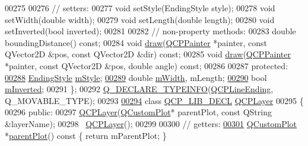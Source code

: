 \begin{DoxyCode}
00275   
00276   \textcolor{comment}{// setters:}
00277   \textcolor{keywordtype}{void} setStyle(EndingStyle style);
00278   \textcolor{keywordtype}{void} setWidth(\textcolor{keywordtype}{double} width);
00279   \textcolor{keywordtype}{void} setLength(\textcolor{keywordtype}{double} length);
00280   \textcolor{keywordtype}{void} setInverted(\textcolor{keywordtype}{bool} inverted);
00281   
00282   \textcolor{comment}{// non-property methods:}
00283   \textcolor{keywordtype}{double} boundingDistance() \textcolor{keyword}{const};
00284   \textcolor{keywordtype}{void} \hyperlink{a00116_a2e9b3d14dffa43c79835869d488936c9}{draw}(\hyperlink{a00047}{QCPPainter} *painter, \textcolor{keyword}{const} QVector2D &pos, \textcolor{keyword}{const} QVector2D &dir) \textcolor{keyword}{const};
00285   \textcolor{keywordtype}{void} \hyperlink{a00116_a2e9b3d14dffa43c79835869d488936c9}{draw}(\hyperlink{a00047}{QCPPainter} *painter, \textcolor{keyword}{const} QVector2D &pos, \textcolor{keywordtype}{double} angle) \textcolor{keyword}{const};
00286   
00287 \textcolor{keyword}{protected}:
\hypertarget{a00116_source_l00288}{}\hyperlink{a00046_a4696fc9117b60f1ca7690fcd2ba56611}{00288}   \hyperlink{a00046_a5ef16e6876b4b74959c7261d8d4c2cd5}{EndingStyle} \hyperlink{a00046_a4696fc9117b60f1ca7690fcd2ba56611}{mStyle};
\hypertarget{a00116_source_l00289}{}\hyperlink{a00046_aca89d21341133c20dc6825c33a5eac48}{00289}   \textcolor{keywordtype}{double} \hyperlink{a00046_aca89d21341133c20dc6825c33a5eac48}{mWidth}, mLength;
\hypertarget{a00116_source_l00290}{}\hyperlink{a00046_a91306fe771d54c955e0af21af14349d5}{00290}   \textcolor{keywordtype}{bool} \hyperlink{a00046_a91306fe771d54c955e0af21af14349d5}{mInverted};
00291 \};
00292 \hyperlink{a00116_ae6c02a20d51ce03bc5dfd27c25a1cc6a}{Q\_DECLARE\_TYPEINFO}(\hyperlink{a00046}{QCPLineEnding}, Q\_MOVABLE\_TYPE);
00293 
\hypertarget{a00116_source_l00294}{}\hyperlink{a00043}{00294} \textcolor{keyword}{class }\hyperlink{a00116_a5eaab02224a642ded7fb8951e973a02c}{QCP\_LIB\_DECL} \hyperlink{a00043}{QCPLayer}
00295 \{
00296 \textcolor{keyword}{public}:
00297   \hyperlink{a00116_a5dbf96bf7664c1b6fce49063eeea6eef}{QCPLayer}(\hyperlink{a00030_d8/d00/a00186}{QCustomPlot}* parentPlot, \textcolor{keyword}{const} QString &layerName);
00298   ~\hyperlink{a00043}{QCPLayer}();
00299   
00300   \textcolor{comment}{// getters:}
\hypertarget{a00116_source_l00301}{}\hyperlink{a00043_a3958c9a938c2d05a7378c41484acee08}{00301}   \hyperlink{a00030_d8/d00/a00186}{QCustomPlot} *\hyperlink{a00043_a3958c9a938c2d05a7378c41484acee08}{parentPlot}()\textcolor{keyword}{ const }\{ \textcolor{keywordflow}{return} mParentPlot; \}

\end{DoxyCode}
